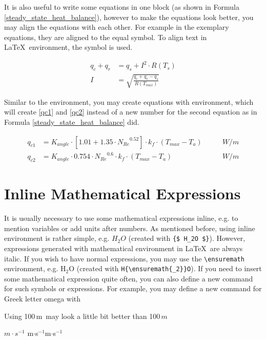 	It is also useful to write some equations in one block (as shown in Formula \ref{steady_state_heat_balance}), however to make the equations look better, you may align the equations with each other. For example in the exemplary equations, they are aligned to the equal symbol. To align text in \LaTeX~environment, the {\color{blue}{\verb|&|}} symbol is used.
	
	\begin{align}
		q_c {+} q_r &= q_s + I^2{\cdot}R \left(T_{s} \right)\\
		I &= \sqrt{\frac{q_c{+}q_r{-}q_s}{R \left(T_{max} \right)}} 
		\label{steady_state_heat_balance}
	\end{align}
	
	Similar to the {\color{blue}{\verb|\aligh|}} environment, you may create equations with {\color{blue}{\verb|\subequations|}} environment, which will create \ref{qc1} and \ref{qc2} instead of a new number for the second equation as in Formula \ref{steady_state_heat_balance} did.
	
	\begin{subequations}
		\begin{align}
		q_{c1} &= K_{angle}{\cdot}\left[1.01{+}1.35{\cdot}{N_{Re}}^{0.52} \right] {\cdot} k_f{\cdot}\left(T_{max}{-}T_a\right) \qquad &W/m \label{qc1}\\ 
		q_{c2} &= K_{angle}{\cdot}0.754{\cdot}{N_{Re}}^{0.6} {\cdot} k_f{\cdot}\left(T_{max}{-}T_a\right) \qquad &W/m \label{qc2}
		\end{align}
	\end{subequations}

\section{Inline Mathematical Expressions}

	It is usually necessary to use some mathematical expressions inline, e.g. to mention variables or add units after numbers. As mentioned before, using {\color{blue}{\verb|{$ $}|}} inline environment is rather simple, e.g. {$ H_2O $} (created with {\verb|{$ H_2O $}|}). However, expressions generated with mathematical environment in \LaTeX~are always italic. If you wish to have normal expressions, you may use the {\verb|\ensuremath|} environment, e.g. H{\ensuremath{_2}}O (created with {\verb|H{\ensuremath{_2}}O|}). If you need to insert some mathematical expression quite often, you can also define a new command for such symbols or expressions. For example, you may define a new command for Greek letter omega with
	
	{\color{blue}{\verb|\newcommand{\intextOmega}{\ensuremath{^\Omega}}|}}
	
	Using 100{\,}m\intextOmega~may look a little bit better than 100{\,}{$ m\ $}
	
	{$ m{\cdot}s^{-1} $}
	m{$ \cdot $}s{$ ^{-1} $}m{\ensuremath{\cdot}s\ensuremath{^{-1}}}



